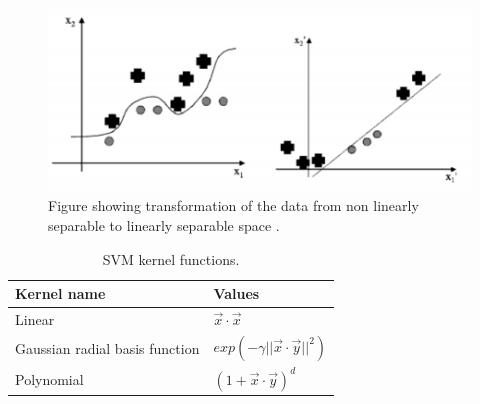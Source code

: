 \documentclass[USenglish]{ifimaster}  %
\begin{document}
\begin{figure}[h]
	\centering
	\includegraphics{Figures/svmtransform}
	\caption[Illustration of transformation]{Figure showing transformation of the data from non linearly separable to linearly separable space \cite{Marsland:2009:MLA:1571643}.}
	\label{fig:svmtransform}
\end{figure}
\FloatBarrier



\begin{table}[h]
	\centering
	\begin{tabular}{ll}
		\hline
		\textbf{Kernel name} & \textbf{Values} \\ \hline
		\multirow{2}{*}{Linear} & \multirow{2}{*}{$\vec{x} \cdot \vec{x}$} \\
		&  \\
		\multirow{2}{*}{Gaussian radial basis function} & \multirow{2}{*}{$exp(-\gamma\vert\vert \vec{x}\cdot\vec{y}\vert\vert^{2})$} \\
		&  \\
		Polynomial & $(1 + \vec{x} \cdot \vec{y})^{d}$  \\ \hline
	\end{tabular}
	\caption[SVM kernel functions]{SVM kernel functions.}
	\label{tab:kern}
\end{table}
\FloatBarrier
	
\end{document}
